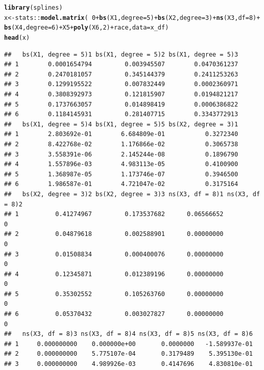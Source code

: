 \documentclass[12pt,letter]{article}\usepackage[]{graphicx}\usepackage[]{color}
\makeatletter
\newcommand{\hlnum}[1]{\textcolor[rgb]{0.686,0.059,0.569}{#1}}%
\newcommand{\hlopt}[1]{\textcolor[rgb]{0,0,0}{#1}}%
\newcommand{\hlstd}[1]{\textcolor[rgb]{0.345,0.345,0.345}{#1}}%
\newcommand{\hlkwb}[1]{\textcolor[rgb]{0.69,0.353,0.396}{#1}}%
\newcommand{\hlkwc}[1]{\textcolor[rgb]{0.333,0.667,0.333}{#1}}%
\newcommand{\hlkwd}[1]{\textcolor[rgb]{0.737,0.353,0.396}{\textbf{#1}}}%
\newenvironment{kframe}{%
 \def\at@end@of@kframe{}%
 \ifinner\ifhmode%
  \def\at@end@of@kframe{\end{minipage}}%
  \begin{minipage}{\columnwidth}%
 \fi\fi%
 \def\FrameCommand##1{\hskip\@totalleftmargin \hskip-\fboxsep
 \colorbox{shadecolor}{##1}\hskip-\fboxsep
     \hskip-\linewidth \hskip-\@totalleftmargin \hskip\columnwidth}%
 \MakeFramed {\advance\hsize-\width
   \@totalleftmargin\z@ \linewidth\hsize
   \@setminipage}}%
 {\par\unskip\endMakeFramed%
 \at@end@of@kframe}
\newenvironment{knitrout}{}{} %
\makeatother
\begin{document}
\begin{knitrout}\scriptsize
{}\color{fgcolor}\begin{kframe}
\begin{alltt}
\hlkwd{library}\hlstd{(splines)}
\hlstd{x} \hlkwb{<-} \hlstd{stats}\hlopt{::}\hlkwd{model.matrix}\hlstd{(}\hlopt{~} \hlnum{0} \hlopt{+}  \hlkwd{bs}\hlstd{(X1,} \hlkwc{degree} \hlstd{=} \hlnum{5}\hlstd{)} \hlopt{+} \hlkwd{bs}\hlstd{(X2,} \hlkwc{degree} \hlstd{=} \hlnum{3}\hlstd{)} \hlopt{+} \hlkwd{ns}\hlstd{(X3,} \hlkwc{df} \hlstd{=} \hlnum{8}\hlstd{)} \hlopt{+}
\hlkwd{bs}\hlstd{(X4,} \hlkwc{degree} \hlstd{=} \hlnum{6}\hlstd{)} \hlopt{+} \hlstd{X5} \hlopt{+} \hlkwd{poly}\hlstd{(X6,}\hlnum{2}\hlstd{)} \hlopt{+} \hlstd{race,} \hlkwc{data} \hlstd{= x_df)}
\hlkwd{head}\hlstd{(x)}
\end{alltt}
\begin{verbatim}
##   bs(X1, degree = 5)1 bs(X1, degree = 5)2 bs(X1, degree = 5)3
## 1        0.0001654794         0.003945507        0.0470361237
## 2        0.2470181057         0.345144379        0.2411253263
## 3        0.1299195522         0.007832449        0.0002360971
## 4        0.3808392973         0.121815907        0.0194821217
## 5        0.1737663057         0.014898419        0.0006386822
## 6        0.1184145931         0.281407715        0.3343772913
##   bs(X1, degree = 5)4 bs(X1, degree = 5)5 bs(X2, degree = 3)1
## 1        2.803692e-01        6.684809e-01           0.3272340
## 2        8.422768e-02        1.176866e-02           0.3065738
## 3        3.558391e-06        2.145244e-08           0.1896790
## 4        1.557896e-03        4.983113e-05           0.4100900
## 5        1.368987e-05        1.173746e-07           0.3946500
## 6        1.986587e-01        4.721047e-02           0.3175164
##   bs(X2, degree = 3)2 bs(X2, degree = 3)3 ns(X3, df = 8)1 ns(X3, df = 8)2
## 1          0.41274967         0.173537682      0.06566652               0
## 2          0.04879618         0.002588901      0.00000000               0
## 3          0.01508834         0.000400076      0.00000000               0
## 4          0.12345871         0.012389196      0.00000000               0
## 5          0.35302552         0.105263760      0.00000000               0
## 6          0.05370432         0.003027827      0.00000000               0
##   ns(X3, df = 8)3 ns(X3, df = 8)4 ns(X3, df = 8)5 ns(X3, df = 8)6
## 1     0.000000000    0.000000e+00       0.0000000   -1.589937e-01
## 2     0.000000000    5.775107e-04       0.3179489    5.395130e-01
## 3     0.000000000    4.989926e-03       0.4147696    4.830810e-01

\end{verbatim}
\end{kframe}
\end{knitrout}
\end{document}
